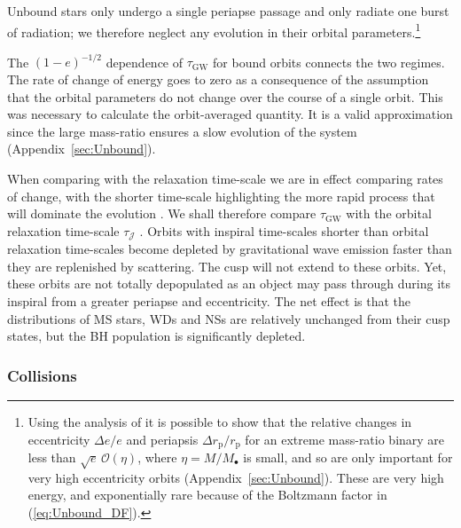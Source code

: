 \documentclass[useAMS,usedcolumn,usegraphicx,usenatbib]{mn2e}
\newcommand{\eqnref}[1]{(\ref{eq:#1})}
\newcommand{\apref}[1]{Appendix~\ref{sec:#1}}
\newcommand{\sub}[1]{\ensuremath{_\mathrm{#1}}}
\newcommand{\order}[1]{\ensuremath{\mathcal{O}({#1})}}
\begin{document}
Unbound stars only undergo a single periapse passage and only radiate one burst of radiation; we therefore neglect any evolution in their orbital parameters.\footnote{Using the analysis of \citet{Turner1977} it is possible to show that the relative changes in eccentricity $\Delta e / e$ and periapsis $\Delta r\sub{p} / r\sub{p}$ for an extreme mass-ratio binary are less than $\sqrt{e}\,\order{\eta}$, where $\eta = M/M_\bullet$ is small, and so are only important for very high eccentricity orbits (\apref{Unbound}). These are very high energy, and exponentially rare because of the Boltzmann factor in \eqnref{Unbound_DF}.}

The $(1-e)^{-1/2}$ dependence of $\tau\sub{GW}$ for bound orbits connects the two regimes. The rate of change of energy goes to zero as a consequence of the assumption that the orbital parameters do not change over the course of a single orbit. This was necessary to calculate the orbit-averaged quantity. It is a valid approximation since the large mass-ratio ensures a slow evolution of the system (\apref{Unbound}).

When comparing with the relaxation time-scale we are in effect comparing rates of change, with the shorter time-scale highlighting the more rapid process that will dominate the evolution \citep{Amaro-Seoane2007}. We shall therefore compare $\tau\sub{GW}$ with the orbital relaxation time-scale $\tau_\mathcal{J}$ \citep{Merritt2011}. Orbits with inspiral time-scales shorter than orbital relaxation time-scales become depleted by gravitational wave emission faster than they are replenished by scattering. The cusp will not extend to these orbits. Yet, these orbits are not totally depopulated as an object may pass through during its inspiral from a greater periapse and eccentricity. The net effect is that the distributions of MS stars, WDs and NSs are relatively unchanged from their cusp states, but the BH population is significantly depleted.

\subsubsection{Collisions}\label{sec:Collision}
\end{document}
